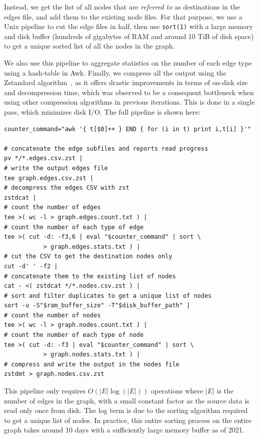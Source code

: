 Instead, we get the list of all nodes that are \emph{referred to} as
destinations in the edges file, and add them to the existing node files. For
that purpose, we use a Unix pipeline to cut the edge files in half, then use
\texttt{sort(1)} with a large memory and disk buffer (hundreds of gigabytes of
RAM and around 10 TiB of disk space) to get a unique sorted list of all the
nodes in the graph.

We also use this pipeline to aggregate statistics on the number of each edge
type using a hash-table in Awk. Finally, we compress all the output using the
Zstandard algorithm~\cite{collet2015zstd}, as it offers drastic improvements in
terms of on-disk size and decompression time, which was observed to be a
consequent bottleneck when using other compression algorithms in previous
iterations. This is done in a single pass, which minimizes disk I/O. The full
pipeline is shown here:

\begin{verbatim}
counter_command="awk '{ t[$0]++ } END { for (i in t) print i,t[i] }'"

# concatenate the edge subfiles and reports read progress
pv */*.edges.csv.zst |
# write the output edges file
tee graph.edges.csv.zst |
# decompress the edges CSV with zst
zstdcat |
# count the number of edges
tee >( wc -l > graph.edges.count.txt ) |
# count the number of each type of edge
tee >( cut -d: -f3,6 | eval "$counter_command" | sort \
           > graph.edges.stats.txt ) |
# cut the CSV to get the destination nodes only
cut -d' ' -f2 |
# concatenate them to the existing list of nodes
cat - <( zstdcat */*.nodes.csv.zst ) |
# sort and filter duplicates to get a unique list of nodes
sort -u -S"$ram_buffer_size" -T"$disk_buffer_path" |
# count the number of nodes
tee >( wc -l > graph.nodes.count.txt ) |
# count the number of each type of node
tee >( cut -d: -f3 | eval "$counter_command" | sort \
           > graph.nodes.stats.txt ) |
# compress and write the output in the nodes file
zstdmt > graph.nodes.csv.zst
\end{verbatim}

This pipeline only requires $O(|E| \log(|E|))$ operations where $|E|$ is the
number of edges in the graph, with a small constant factor as the source data
is read only once from disk. The log term is due to the sorting algorithm
required to get a unique list of nodes. In practice, this entire sorting
process on the entire graph takes around 10 days with a sufficiently large
memory buffer as of 2021.

